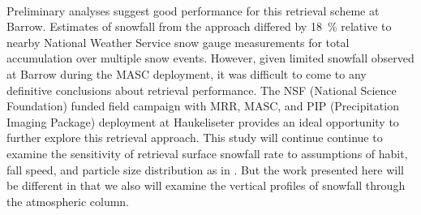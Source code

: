 \\
%
Preliminary analyses suggest good performance for this retrieval scheme at Barrow. Estimates of snowfall from the \citet{cooper_variational_2017} approach differed by \SI{18}{\percent} relative to nearby National Weather Service snow gauge measurements for total accumulation over multiple snow events. However, given limited snowfall observed at Barrow during the MASC deployment, it was difficult to come to any definitive conclusions about retrieval performance. The NSF (National Science Foundation) funded field campaign with MRR, MASC, and PIP (Precipitation Imaging Package) deployment at Haukeliseter provides an ideal opportunity to further explore this retrieval approach. This study will continue continue to examine the sensitivity of retrieval surface snowfall rate to assumptions of habit, fall speed, and particle size distribution as in \citet{cooper_variational_2017}. But the work presented here will be different in that we also will examine the vertical profiles of snowfall through the atmospheric column.  

